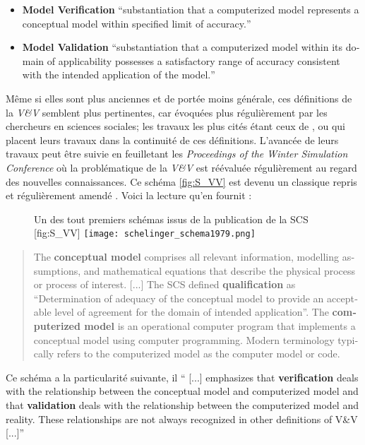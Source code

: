 \begin{itemize}
\item \textbf{Model Verification} \foreignquote{english}{substantiation that a computerized model represents a conceptual model within specified limit of accuracy.}
\item \textbf{Model Validation} \foreignquote{english}{substantiation that a computerized model within its domain of applicability possesses a satisfactory range of accuracy consistent with the intended application of the model.}
\end{itemize}

Même si elles sont plus anciennes et de portée moins générale, ces définitions de la \textit{V\&V} semblent plus pertinentes, car évoquées plus régulièrement par les chercheurs en sciences sociales; les travaux les plus cités étant ceux de \textcite{Kleijnen1995}, ou \textcite{Sargent2010} qui placent leurs travaux dans la continuité de ces définitions. L'avancée de leurs travaux peut être suivie en feuilletant les \textit{Proceedings of the Winter Simulation Conference} où la problématique de la \textit{V\&V} est réévaluée régulièrement au regard des nouvelles connaissances. Ce schéma \ref{fig:S_VV} est devenu un classique repris et régulièrement amendé \autocite{Sargent2010}. Voici la lecture qu'en fournit \autocite{Oberkampf2010} :

\begin{figure}[htbp]
	\begin{sidecaption}[fortoc]{Un des tout premiers schémas issus de la publication de la SCS \autocites{Oberkampf2010,Schlesinger1979}}[fig:S_VV]
	  \centering
	 \texttt{[image: schelinger\_schema1979.png]}
	  \end{sidecaption}
\end{figure}

\foreignblockquote{english}[\cite{Oberkampf2010}]{The \textbf{conceptual model} comprises all relevant information, modelling assumptions, and mathematical equations that describe the physical process or process of interest. [...] The SCS defined \textbf{qualification} as \enquote{Determination of adequacy of the conceptual model to provide an acceptable level of agreement for the domain of intended application}. The \textbf{computerized model} is an operational computer program that implements a conceptual model using computer programming. Modern terminology typically refers to the computerized model as the computer model or code.}

Ce schéma a la particularité suivante, il \foreignquote{english}{ [...] emphasizes that \textbf{verification} deals with the relationship between the conceptual model and computerized model and that \textbf{validation} deals with the relationship between the computerized model and reality. These relationships are not always recognized in other definitions of V\&V [...]}

